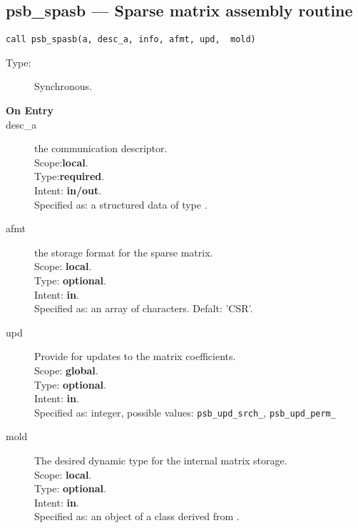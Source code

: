 %
%
\clearpage\subsection{psb\_spasb --- Sparse matrix assembly routine}

\begin{verbatim}
call psb_spasb(a, desc_a, info, afmt, upd,  mold)
\end{verbatim}

\begin{description}
\item[Type:] Synchronous.
\item[\bf On Entry]
\item[desc\_a] the communication descriptor.\\
Scope:{\bf local}.\\
Type:{\bf required}.\\
Intent: {\bf in/out}.\\
Specified as: a structured data of type \descdata.
\item[afmt] the storage format for the sparse matrix.\\
Scope: {\bf local}.\\
Type: {\bf optional}.\\
Intent: {\bf in}.\\
Specified as: an array of characters. Defalt:  'CSR'.
\item[upd] Provide for updates to the matrix coefficients.\\
Scope: {\bf global}.\\
Type: {\bf optional}.\\
Intent: {\bf in}.\\
Specified as: integer, possible values: \verb|psb_upd_srch_|, \verb|psb_upd_perm_|
\item[mold] The desired dynamic type for the internal matrix storage.\\
Scope: {\bf local}.\\
Type: {\bf optional}.\\
Intent: {\bf in}.\\
Specified as: an object of a class derived from \spbasedata. 
\end{description}

